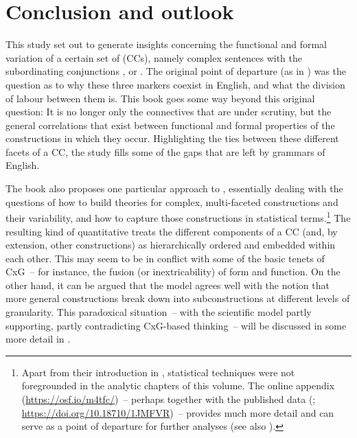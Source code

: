 \chapter{Conclusion and outlook}\label{sec:12}\label{ch:12}\label{bkm:Ref4146401}\label{bkm:Ref60664348}

This study set out to generate insights concerning the functional and formal variation of a certain set of  (CCs), namely complex sentences with the subordinating conjunctions ,  or . The original point of departure (as in \citealt{Schützler2018c}) was the question as to why these three markers coexist in English, and what the division of labour between them is. This book goes some way beyond this original question: It is no longer only the connectives that are under scrutiny, but the general correlations that exist between functional and formal properties of the constructions in which they occur. Highlighting the ties between these different facets of a CC, the study fills some of the gaps that are left by grammars of English.

The book also proposes one particular approach to , essentially dealing with the questions of how to build theories for complex, multi-faceted constructions and their variability, and how to capture those constructions in statistical terms.\footnote{Apart from their introduction in , statistical techniques were not foregrounded in the analytic chapters of this volume. The online appendix (\url{https://osf.io/m4tfc/})~– perhaps together with the published data (\citealt{Schützler2021}; \url{https://doi.org/10.18710/1JMFVR})~– provides much more detail and can serve as a point of departure for further analyses (see also ).} The resulting kind of quantitative  treats the different components of a CC (and, by extension, other constructions) as hierarchically ordered and embedded within each other. This may seem to be in conflict with some of the basic tenets of CxG~– for instance, the fusion (or inextricability) of form and function. On the other hand, it can be argued that the model agrees well with the notion that more general constructions break down into subconstructions at different levels of granularity. This paradoxical situation~– with the scientific model partly supporting, partly contradicting CxG-based thinking~– will be discussed in some more detail in .

